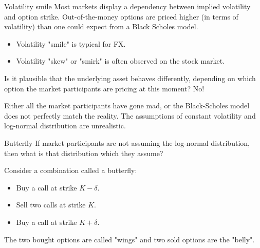 \documentclass{beamer}
\begin{document}
\begin{frame}{Volatility smile}
\justify
Most markets display a dependency between implied volatility and option strike. Out-of-the-money options are priced higher (in terms of volatility) than one could expect from a Black Scholes model.

\begin{itemize}
\item Volatility "smile" is typical for FX.
\item Volatility "skew" or "smirk" is often observed on the stock market.
\end{itemize}

\justify
Is it plausible that the underlying asset behaves differently, depending on which option the market participants are pricing at this moment? No!

\justify
Either all the market participants have gone mad, or the Black-Scholes model does not perfectly match the reality. The assumptions of constant volatility and log-normal distribution are unrealistic.
\end{frame}



\begin{frame}{Butterfly}
\justify
If market participants are not assuming the log-normal distribution, then what is that distribution which they assume?

\justify
Consider a combination called a butterfly:
\begin{itemize}
\item Buy a call at strike $K - \delta$.
\item Sell two calls at strike $K$.
\item Buy a call at strike $K + \delta$.
\end{itemize}

\justify
The two bought options are called "wings" and two sold options are the "belly".
\end{frame}
\end{document}
